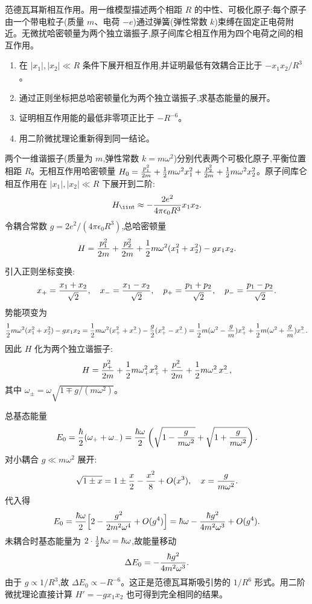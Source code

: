 \begin{question}
范德瓦耳斯相互作用。用一维模型描述两个相距 $R$ 的中性、可极化原子:每个原子由一个带电粒子(质量 $m$、电荷 $-e$)通过弹簧(弹性常数 $k$)束缚在固定正电荷附近。无微扰哈密顿量为两个独立谐振子,原子间库仑相互作用为四个电荷之间的相互作用。
\begin{enumerate}
\item 在 $|x_1|,|x_2|\ll R$ 条件下展开相互作用,并证明最低有效耦合正比于 $-x_1x_2/R^3$。
\item 通过正则坐标把总哈密顿量化为两个独立谐振子,求基态能量的展开。
\item 证明相互作用能的最低非零项正比于 $-R^{-6}$。
\item 用二阶微扰理论重新得到同一结论。
\end{enumerate}
\end{question}
\begin{solution}
两个一维谐振子(质量为 $m$,弹性常数 $k=m\omega^2$)分别代表两个可极化原子,平衡位置相距 $R$。无相互作用哈密顿量 $H_0={p_1^2\over2m}+{1\over2}m\omega^2x_1^2+{p_2^2\over2m}+{1\over2}m\omega^2x_2^2$。原子间库仑相互作用在 $|x_1|,|x_2|\ll R$ 下展开到二阶:
\[
H_{\rm \ii nt} \approx -{2e^2\over4\pi\epsilon_0 R^3}x_1x_2.
\]
令耦合常数 $g=2e^2/(4\pi\epsilon_0 R^3)$,总哈密顿量
\[
H = {p_1^2\over2m}+{p_2^2\over2m}+{1\over2}m\omega^2(x_1^2+x_2^2)-g x_1x_2.
\]

引入正则坐标变换:
\[
x_+ = {x_1+x_2\over\sqrt2},\quad x_- = {x_1-x_2\over\sqrt2},\quad
p_+ = {p_1+p_2\over\sqrt2},\quad p_- = {p_1-p_2\over\sqrt2}.
\]
势能项变为
\[
{1\over2}m\omega^2(x_1^2+x_2^2)-g x_1x_2
= {1\over2}m\omega^2(x_+^2+x_-^2)-{g\over2}(x_+^2-x_-^2)
= {1\over2}m(\omega^2-{g\over m})x_+^2
+ {1\over2}m(\omega^2+{g\over m})x_-^2.
\]
因此 $H$ 化为两个独立谐振子:
\[
H = {p_+^2\over2m}+{1\over2}m\omega_+^2x_+^2
+ {p_-^2\over2m}+{1\over2}m\omega_-^2x_-^2,
\]
其中 $\omega_\pm = \omega\sqrt{1\mp g/(m\omega^2)}$。

总基态能量
\[
E_0 = {\hbar\over2}(\omega_++\omega_-)
= {\hbar\omega\over2}\left(\sqrt{1-{g\over m\omega^2}}+\sqrt{1+{g\over m\omega^2}}\right).
\]
对小耦合 $g\ll m\omega^2$ 展开:
\[
\sqrt{1\pm x} = 1\pm{x\over2}-{x^2\over8}+O(x^3),\quad x={g\over m\omega^2}.
\]
代入得
\[
E_0 = {\hbar\omega\over2}\Bigl[2 - {g^2\over2m^2\omega^4}+O(g^4)\Bigr]
= \hbar\omega - {\hbar g^2\over4m^2\omega^3}+O(g^4).
\]
未耦合时基态能量为 $2\cdot{1\over2}\hbar\omega=\hbar\omega$,故能量移动
\[
\Delta E_0 = -{\hbar g^2\over4m^2\omega^3}.
\]
由于 $g\propto 1/R^3$,故 $\Delta E_0 \propto -R^{-6}$。这正是范德瓦耳斯吸引势的 $1/R^6$ 形式。用二阶微扰理论直接计算 $H'=-g x_1x_2$ 也可得到完全相同的结果。
\end{solution}

